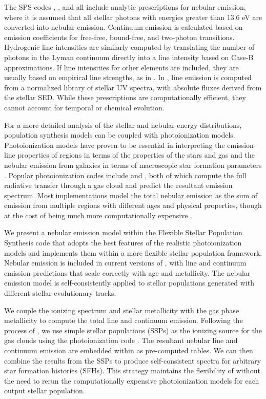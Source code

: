 The SPS codes \Pegase \citep{Fioc99}, \Popstar \citep{Molla09}, and \SB \citep{Leitherer99} all include analytic prescriptions for nebular emission, where it is assumed that all stellar photons with energies greater than 13.6 eV are converted into nebular emission. Continuum emission is calculated based on emission coefficients for free-free, bound-free, and two-photon transitions. Hydrogenic line intensities are similarly computed by translating the number of photons in the Lyman continuum directly into a line intensity based on Case-B approximations. If line intensities for other elements are included, they are usually based on empirical line strengths, as in \Pegase. In \SB, line emission is computed from a normalized library of stellar UV spectra, with absolute fluxes derived from the stellar SED. While these prescriptions are computationally efficient, they cannot account for temporal or chemical evolution.

For a more detailed analysis of the stellar and nebular energy distributions, population synthesis models can be coupled with photoionization models. Photoionization models have proven to be essential in interpreting the emission-line properties of \hii regions in terms of the properties of the stars and gas \citep[e.g.,][]{Dopita00} and the nebular emission from galaxies in terms of macroscopic star formation parameters \citep[e.g.,][]{Brinchmann04}. Popular photoionization codes include \Cloudy \citep{Ferland13} and \Mappings \citep{Groves04}, both of which compute the full radiative transfer through a gas cloud and predict the resultant emission spectrum. Most implementations model the total nebular emission as the sum of emission from multiple \hii regions with different ages and physical properties, though at the cost of being much more computationally expensive \citep[e.g.,][]{Kewley01, Moy01, CL01, Dopita06}.

We present a nebular emission model within the Flexible Stellar Population Synthesis code \citep[\FSPS\footnote{available on GitHub \url{https://github.com/cconroy20/fsps}},][]{Conroy09} that adopts the best features of the realistic photoionization models and implements them within a more flexible stellar population framework. Nebular emission is included in current versions of \FSPS, with line and continuum emission predictions that scale correctly with age and metallicity. The nebular emission model is self-consistently applied to stellar populations generated with different stellar evolutionary tracks.

We couple the ionizing spectrum and stellar metallicity with the gas phase metallicity to compute the total line and continuum emission. Following the process of \citet{CL01}, we use simple stellar populations (SSPs) as the ionizing source for the gas clouds using the photoionization code \Cloudy. The resultant nebular line and continuum emission are embedded within \FSPS as pre-computed tables. We can then combine the results from the SSPs to produce self-consistent spectra for arbitrary star formation histories (SFHs). This strategy maintains the flexibility of \FSPS without the need to rerun the computationally expensive photoionization models for each output stellar population.

